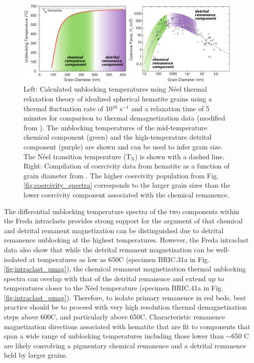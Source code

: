 \documentclass[draft]{agujournal2018}
\begin{document}
\begin{figure}[!ht]
\noindent\includegraphics[width=\textwidth]{figures/component_summary.pdf}
\caption{\small{Left: Calculated unblocking temperatures using N\'eel thermal relaxation theory of idealized spherical hematite grains using a thermal fluctuation rate of 10$^{10}$ s$^{-1}$ and a relaxation time of 5 minutes for comparison to thermal demagnetization data (modified from \citealp{Swanson-Hysell2011a}). The unblocking temperatures of the mid-temperature chemical component (green) and the high-temperature detrital component (purple) are shown and can be used to infer grain size. The N\'eel transition temperature (T$_{\mathrm{N}}$) is shown with a dashed line. Right: Compilation of coercivity data from hematite as a function of grain diameter from \cite{Ozdemir2014a}. The higher coercivity population from Fig. \ref{fig:coercivity_spectra} corresponds to the larger grain sizes than the lower coercivity component associated with the chemical remanence.}}
\label{fig:summary}
\end{figure}

The differential unblocking temperature spectra of the two components within the Freda intraclasts provides strong support for the argument of \citet{Jiang2015a} that chemical and detrital remanent magnetization can be distinguished due to detrital remanence unblocking at the highest temperatures. However, the Freda intraclast data also show that while the detrital remanent magnetization can be well-isolated at temperatures as low as 650\textdegree C (specimen BRIC.31a in Fig. \ref{fig:intraclast_pmag}), the chemical remanent magnetization thermal unblocking spectra can overlap with that of the detrital remanence and extend up to temperatures closer to the N\'eel temperature (specimen BRIC.41a in Fig. \ref{fig:intraclast_pmag}). Therefore, to isolate primary remanence in red beds, best practice should be to proceed with very high resolution thermal demagnetization steps above 600\textdegree C, and particularly above 650\textdegree C. Characteristic remanence magnetization directions associated with hematite that are fit to components that span a wide range of unblocking temperatures including those lower than $\sim$650 \textdegree C are likely convolving a pigmentary chemical remanence and a detrital remanence held by larger grains. 
\end{document}
